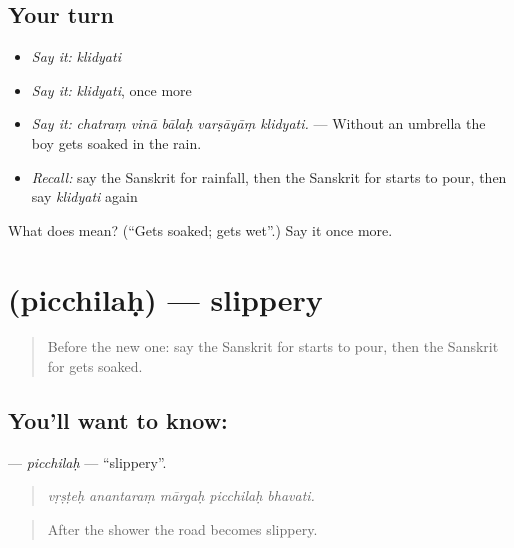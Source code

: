 \subsection*{Your turn}
\begin{itemize}
\raggedright
  \item \emph{Say it:} \emph{klidyati}
  \item \emph{Say it:} \emph{klidyati}, once more
  \item \emph{Say it:} \emph{chatraṃ vinā bālaḥ varṣāyāṃ klidyati.} — Without an umbrella the boy gets soaked in the rain.
  \item \emph{Recall:} say the Sanskrit for rainfall, then the Sanskrit for starts to pour, then say \emph{klidyati} again
\end{itemize}

\begin{tcolorbox}[breakable,colback=teal!4,colframe=teal!35!black,title={Before you move on}]
What does  mean? (\textquotedblleft{}Gets soaked; gets wet\textquotedblright{}.) Say it once more.
\end{tcolorbox}
\section[\texorpdfstring{\sk{पिच्छिलः} (picchilaḥ)}{पिच्छिलः (picchilaḥ)}]{ (picchilaḥ) — slippery}

\label{lesson:SA-C436-picchilah}



\begin{quote}
Before the new one: say the Sanskrit for starts to pour, then the Sanskrit for gets soaked.
\end{quote}

\subsection*{You'll want to know: }
\textbf{} — \emph{picchilaḥ} — \textquotedblleft{}slippery\textquotedblright{}.

\begin{quote}
    
\end{quote}

\begin{quote}
\emph{vṛṣṭeḥ anantaraṃ mārgaḥ picchilaḥ bhavati.}
\end{quote}

\begin{quote}
After the shower the road becomes slippery.
\end{quote}


